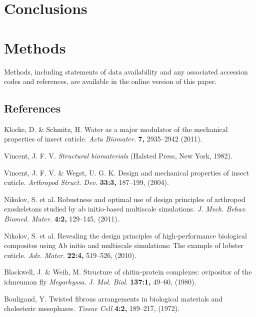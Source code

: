 \documentclass[twocolumn, linenumbers, superscriptaddress]{revtex4-1}
\begin{document}
	\section{Conclusions} %

	\section{Methods}
		Methods, including statements of data availability and any associated accession codes and references, are available in the online version of this paper.
	
	\begin{thebibliography}{50}
		\section*{References}	
				Klocke, D. \& Schmitz, H.
				Water as a major modulator of the mechanical properties of insect cuticle.
				\textit{Acta Biomater.}
				\textbf{7,}
				2935--2942
				(2011).
				
				Vincent, J. F. V.
				\textit{Structural biomaterials}
				(Halsted Press,
				New York,
				1982).
				
				Vincent, J. F. V. \& Wegst, U. G. K.
				Design and mechanical properties of insect cuticle.				
				\textit{Arthropod Struct. Dev.}
				\textbf{33:3,}
				187--199,
				(2004).
				
				Nikolov, S. et al.
				Robustness and optimal use of design principles of arthropod exoskeletons studied by ab initio-based multiscale simulations.
				\textit{J. Mech. Behav. Biomed. Mater.}
				\textbf{4:2,}
				129--145,
				(2011).
				
				Nikolov, S. et al.
				Revealing the design principles of high-performance biological composites using Ab initio and multiscale simulations: The example of lobster cuticle.
				\textit{Adv. Mater.}
				\textbf{22:4,}
				519--526,
				(2010).
				
				Blackwell, J. \& Weih, M.
				Structure of chitin-protein complexes: ovipositor of the ichneumon fly \textit{Megarhyssa}.
				\textit{J. Mol. Biol.}
				\textbf{137:1,}
				49--60,
				(1980).

				Bouligand, Y.
				Twisted fibrous arrangements in biological materials and cholesteric mesophases.
				\textit{Tissue Cell}
				\textbf{4:2,}
				189--217,
				(1972).
				

\end{thebibliography}
\end{document}
